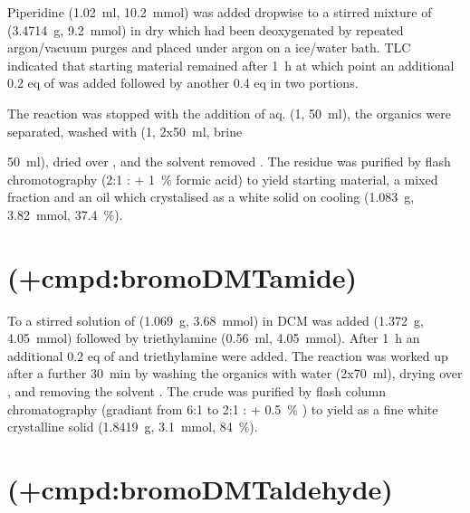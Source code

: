 {Piperidine (\SI{1.02}{\milli\litre}, \SI{10.2}{\milli\mol}) was added dropwise to a stirred mixture of  (\SI{3.4714}{\gram}, \SI{9.2}{\milli\mol}) in dry  which had been deoxygenated by repeated argon/vacuum purges and placed under argon on a ice/water bath. TLC indicated that starting material remained after \SI{1}{\hour} at which point an additional 0.2 eq of  was added followed by another 0.4 eq in two portions.

The reaction was stopped with the addition of aq.  (\SI{1}{\Molar}, \SI{50}{\milli\litre}), the organics were separated, washed with  (\SI{1}{\Molar}, 2x\SI{50}{\milli\litre}, brine {\SI{50}{\milli\litre}), dried over , and the solvent removed \invacuo. The residue was purified by flash chromotography (2:1 : + \SI{1}{\percent} formic acid) to yield starting material, a mixed fraction and an oil which crystalised as a white solid  on cooling (\SI{1.083}{\gram}, \SI{3.82}{\milli\mol}, \SI{37.4}{\percent}).


\section{ (\cmpd+{cmpd:bromoDMTamide})}

To a stirred solution of  (\SI{1.069}{\gram}, \SI{3.68}{\milli\mol}) in DCM was added  (\SI{1.372}{\gram}, \SI{4.05}{\milli\mol}) followed by triethylamine (\SI{0.56}{\milli\litre}, \SI{4.05}{\milli\mol}). After \SI{1}{\hour} an additional 0.2 eq of  and triethylamine were added. The reaction was worked up after a further \SI{30}{\minute} by washing the organics with water (2x\SI{70}{\milli\litre}), drying over , and removing the solvent \invacuo. The crude was purified by flash column chromatography (gradiant from 6:1 to 2:1 : + \SI{0.5}{\percent} ) to yield  as a fine white crystalline solid (\SI{1.8419}{\gram}, \SI{3.1}{\milli\mol}, \SI{84}{\percent}).


\section{ (\cmpd+{cmpd:bromoDMTaldehyde})}

}}
